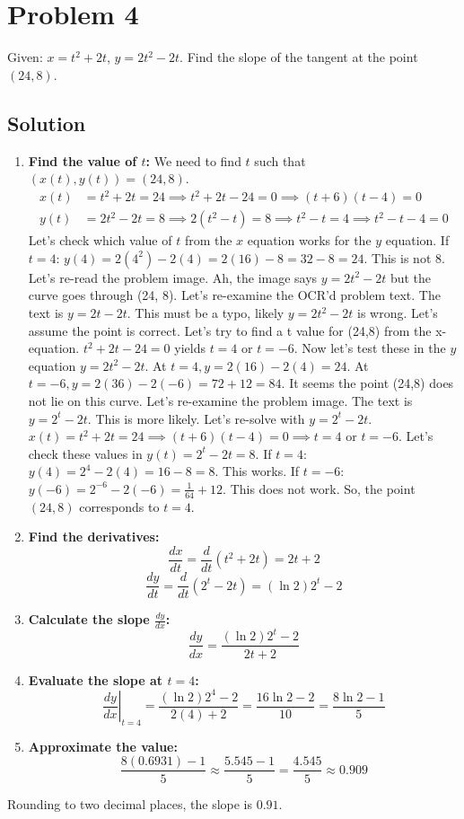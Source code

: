 \documentclass{article}
\begin{document}
\section{Problem 4}
Given: $x = t^2 + 2t$, $y = 2t^2 - 2t$. Find the slope of the tangent at the point $(24, 8)$.

\subsection*{Solution}
\begin{enumerate}
    \item \textbf{Find the value of $t$:} We need to find $t$ such that $(x(t), y(t)) = (24, 8)$.
    \begin{align*}
        x(t) &= t^2 + 2t = 24 \implies t^2 + 2t - 24 = 0 \implies (t+6)(t-4) = 0 \\
        y(t) &= 2t^2 - 2t = 8 \implies 2(t^2 - t) = 8 \implies t^2 - t = 4 \implies t^2 - t - 4 = 0
    \end{align*}
    Let's check which value of $t$ from the $x$ equation works for the $y$ equation.
    If $t=4$: $y(4) = 2(4^2) - 2(4) = 2(16) - 8 = 32 - 8 = 24$. This is not 8. Let's re-read the problem image. Ah, the image says $y = 2t^2 - 2t$ but the curve goes through (24, 8). Let's re-examine the OCR'd problem text. The text is $y=2t - 2t$. This must be a typo, likely $y=2t^2 - 2t$ is wrong. Let's assume the point is correct. Let's try to find a t value for (24,8) from the x-equation. $t^2+2t-24=0$ yields $t=4$ or $t=-6$. Now let's test these in the $y$ equation $y=2t^2-2t$. At $t=4, y=2(16)-2(4)=24$. At $t=-6, y=2(36)-2(-6)=72+12=84$. It seems the point (24,8) does not lie on this curve. Let's re-examine the problem image. The text is $y=2^t-2t$. This is more likely.
    Let's re-solve with $y = 2^t - 2t$.
    $x(t) = t^2 + 2t = 24 \implies (t+6)(t-4) = 0 \implies t = 4$ or $t = -6$.
    Let's check these values in $y(t) = 2^t - 2t = 8$.
    If $t=4$: $y(4) = 2^4 - 2(4) = 16 - 8 = 8$. This works.
    If $t=-6$: $y(-6) = 2^{-6} - 2(-6) = \frac{1}{64} + 12$. This does not work.
    So, the point $(24, 8)$ corresponds to $t=4$.

    \item \textbf{Find the derivatives:}
    \[ \frac{dx}{dt} = \frac{d}{dt}(t^2+2t) = 2t+2 \]
    \[ \frac{dy}{dt} = \frac{d}{dt}(2^t - 2t) = (\ln 2)2^t - 2 \]
    \item \textbf{Calculate the slope $\frac{dy}{dx}$:}
    \[ \frac{dy}{dx} = \frac{(\ln 2)2^t - 2}{2t+2} \]
    \item \textbf{Evaluate the slope at $t=4$:}
    \[ \left.\frac{dy}{dx}\right|_{t=4} = \frac{(\ln 2)2^4 - 2}{2(4)+2} = \frac{16\ln 2 - 2}{10} = \frac{8\ln 2 - 1}{5} \]
    \item \textbf{Approximate the value:}
    \[ \frac{8(0.6931) - 1}{5} \approx \frac{5.545 - 1}{5} = \frac{4.545}{5} \approx 0.909 \]
\end{enumerate}
Rounding to two decimal places, the slope is $0.91$.
\end{document}
